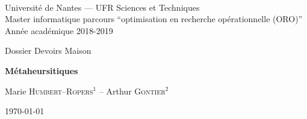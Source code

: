 \documentclass[a4paper,10pt]{article}
\begin{document}
~
\vspace{50mm}
{\large
\begin{center}
  Université de Nantes --- UFR Sciences et Techniques\\
  Master informatique parcours ``optimisation en recherche opérationnelle (ORO)''\\
  Année académique 2018-2019
  \vspace{30mm}
 
  { \LARGE
 
     Dossier Devoirs Maison\\
     \vspace{5mm}
 
     {\huge \textbf{Métaheursitiques}}
     \vspace{5mm}
 
     Marie \textsc{Humbert--Ropers}$^1$ --  Arthur \textsc{Gontier}$^2$
     \vspace{50mm}
  
     \today
  }  
\end{center}
}

\vfill
\break






\end{document}
